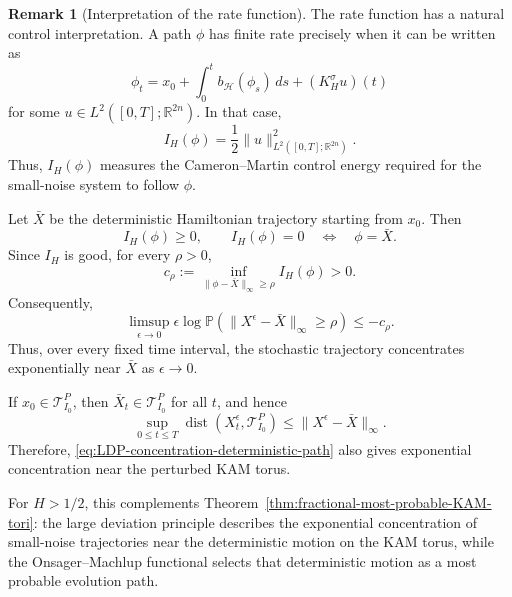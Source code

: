 \documentclass[preprint,12pt]{elsarticle}
\theoremstyle{definition}
\newtheorem{remark}{Remark}[section]
\theoremstyle{plain}
\begin{document}
\begin{remark}[Interpretation of the rate function]
\label{rem:Hamiltonian-LDP-interpretation}
The rate function has a natural control interpretation. A path $\phi$
has finite rate precisely when it can be written as
\begin{equation*}
    \phi_t
    =
    x_0
    +
    \int_0^t b_{\mathscr H}(\phi_s)\,ds
    +
    (K_H^\sigma u)(t)
\end{equation*}
for some $u\in L^2([0,T];\mathbb R^{2n})$. In that case,
\begin{equation*}
    I_H(\phi)
    =
    \frac12
    \|u\|_{L^2([0,T];\mathbb R^{2n})}^2.
\end{equation*}
Thus, $I_H(\phi)$ measures the Cameron--Martin control energy required
for the small-noise system to follow $\phi$.

Let $\bar X$ be the deterministic Hamiltonian trajectory starting
from $x_0$. Then
\begin{equation*}
    I_H(\phi)\geq0,
    \qquad
    I_H(\phi)=0
    \quad\Longleftrightarrow\quad
    \phi=\bar X.
\end{equation*}
Since $I_H$ is good, for every $\rho>0$,
\begin{equation*}
    c_\rho
    :=
    \inf_{\|\phi-\bar X\|_\infty\geq\rho}I_H(\phi)
    >
    0.
\end{equation*}
Consequently,
\begin{equation}
\label{eq:LDP-concentration-deterministic-path}
    \limsup_{\epsilon\to0}
    \epsilon
    \log
    \mathbb P
    \left(
        \|X^\epsilon-\bar X\|_\infty\geq\rho
    \right)
    \leq
    -c_\rho.
\end{equation}
Thus, over every fixed time interval, the stochastic trajectory
concentrates exponentially near $\bar X$ as $\epsilon\to0$.

If $x_0\in\mathcal T_{I_0}^{P}$, then
$\bar X_t\in\mathcal T_{I_0}^{P}$ for all $t$, and hence
\begin{equation*}
    \sup_{0\leq t\leq T}
    \operatorname{dist}
    \left(
        X_t^\epsilon,\mathcal T_{I_0}^{P}
    \right)
    \leq
    \|X^\epsilon-\bar X\|_\infty.
\end{equation*}
Therefore, \eqref{eq:LDP-concentration-deterministic-path} also gives
exponential concentration near the perturbed KAM torus.

For $H>1/2$, this complements
Theorem~\ref{thm:fractional-most-probable-KAM-tori}: the large
deviation principle describes the exponential concentration of
small-noise trajectories near the deterministic motion on the KAM
torus, while the Onsager--Machlup functional selects that
deterministic motion as a most probable evolution path.
\end{remark}
\end{document}
